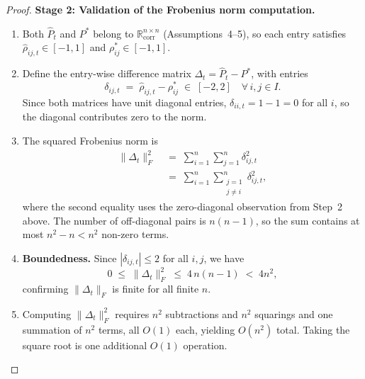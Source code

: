 \documentclass[12pt,openany]{book}
\newcommand{\R}{\mathbb{R}}
\numberwithin{equation}{chapter}
\theoremstyle{plain}
\theoremstyle{definition}
\theoremstyle{remark}
\def\mathcal#1{#1}%
\begin{document}
\begin{proof}
\medskip
\noindent\textbf{Stage 2: Validation of the Frobenius norm
computation.}
\begin{enumerate}
  \item Both $\hat{P}_t$ and $P^*$ belong to
        $\R^{n\times n}_{\mathrm{corr}}$ (Assumptions~4--5), so
        each entry satisfies
        $\hat{\rho}_{ij,t} \in [-1,1]$ and
        $\rho^*_{ij} \in [-1,1]$.

  \item Define the entry-wise difference matrix
        $\Delta_t = \hat{P}_t - P^*$, with entries
        \begin{equation}
          \delta_{ij,t}
          \;=\;
          \hat{\rho}_{ij,t} - \rho^*_{ij}
          \;\in\; [-2, 2]
          \quad \forall\, i,j \in \mathcal{I}.
          \label{eq:delta-entry}
        \end{equation}
        Since both matrices have unit diagonal entries,
        $\delta_{ii,t} = 1 - 1 = 0$ for all $i$, so the
        diagonal contributes zero to the norm.

  \item The squared Frobenius norm is
        \begin{align}
          \|\Delta_t\|_F^2
          &\;=\;
          \sum_{i=1}^{n}\sum_{j=1}^{n} \delta_{ij,t}^2
          \label{eq:frob-sq-full}\\
          &\;=\;
          \sum_{i=1}^{n}\sum_{\substack{j=1\\j\neq i}}^{n}
            \delta_{ij,t}^2,
          \label{eq:frob-sq-offdiag}
        \end{align}
        where the second equality uses the zero-diagonal observation
        from Step~2 above.  The number of off-diagonal pairs is
        $n(n-1)$, so the sum contains at most $n^2 - n < n^2$ non-zero
        terms.

  \item \textbf{Boundedness.}
        Since $|\delta_{ij,t}| \leq 2$ for all $i,j$, we have
        \begin{equation}
          0
          \;\leq\;
          \|\Delta_t\|_F^2
          \;\leq\;
          4\,n(n-1)
          \;<\; 4n^2,
          \label{eq:frob-bound}
        \end{equation}
        confirming $\|\Delta_t\|_F$ is finite for all finite $n$.

  \item Computing $\|\Delta_t\|_F^2$ requires $n^2$ subtractions
        and $n^2$ squarings and one summation of $n^2$ terms, all
        $O(1)$ each, yielding $O(n^2)$ total.  Taking the square root
        is one additional $O(1)$ operation.
\end{enumerate}


\end{proof}
\end{document}

